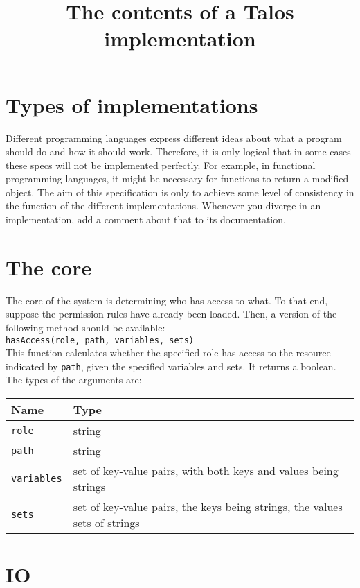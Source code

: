 \documentclass{article}
\title{The contents of a Talos implementation}
\begin{document}
	\maketitle

	\section{Types of implementations}
	Different programming languages express different ideas about what a program should do and how it should work. Therefore, it is only logical that in some cases these specs will not be implemented perfectly. For example, in functional programming languages, it might be necessary for functions to return a modified object. The aim of this specification is only to achieve some level of consistency in the function of the different implementations. Whenever you diverge in an implementation, add a comment about that to its documentation.
	
	\section{The core}
	The core of the system is determining who has access to what. To that end, suppose the permission rules have already been loaded. Then, a version of the following method should be available:\\
	\texttt{hasAccess(role, path, variables, sets)}\\
	This function calculates whether the specified role has access to the resource indicated by \texttt{path}, given the specified variables and sets. It returns a boolean. The types of the arguments are:\\
	\begin{tabular}{l|p{}}
		\textbf{Name} & \textbf{Type}\\\hline
		\texttt{role} & string\\\hline
		\texttt{path} & string\\\hline
		\texttt{variables} & set of key-value pairs, with both keys and values being strings\\\hline
		\texttt{sets} & set of key-value pairs, the keys being strings, the values sets of strings
	\end{tabular}
	
	\section{IO}
\end{document}
